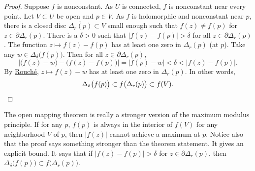 \documentclass[12pt,openany]{book}
\newcommand{\sabs}[1]{\lvert {#1} \rvert}
\newcommand{\abs}[1]{\left\lvert {#1} \right\rvert}
\theoremstyle{plain}
\theoremstyle{remark}
\theoremstyle{definition}
\theoremstyle{exercise}
\theoremstyle{example}
\begin{document}
\begin{proof}
Suppose $f$ is nonconstant.  As $U$ is connected, $f$ is nonconstant
near every point.
Let $V \subset U$ be open and $p \in V$.
As $f$
is holomorphic and nonconstant near $p$,  
there is a closed disc $\overline{\Delta_r(p)} \subset V$ small enough such that
$f(z) \not= f(p)$ for $z \in \partial \Delta_r(p)$.
There is a $\delta > 0$ such
that $\abs{f(z)-f(p)} > \delta$ for all $z \in \partial \Delta_r(p)$.
The function $z \mapsto f(z)-f(p)$ has at least one zero in $\Delta_r(p)$
(at $p$).  Take any $w \in \Delta_{\delta}\bigl(f(p)\bigr)$.  Then for
all $z \in \partial \Delta_r(p)$,
\begin{equation*}
\abs{\bigl( f(z)-w \bigr) - \bigl( f(z)-f(p) \bigr)} = \abs{f(p)-w} <
\delta < \abs{f(z)-f(p)} .
\end{equation*}
By \hyperref[thm:rouche2]{Rouch\'e}, $z \mapsto f(z)-w$ has at least one
zero in $\Delta_r(p)$.
In other words,
\begin{equation*}
\Delta_{\delta}\bigl(f(p)\bigr) \subset
f\bigl(\Delta_r(p)\bigr) \subset f(V) .  \qedhere
\end{equation*}
\end{proof}

The open mapping theorem is really a stronger version of
the maximum modulus principle.
If for any $p$,
$f(p)$ is always in the interior of $f(V)$ for any neighborhood $V$ of
$p$, then $\sabs{f(z)}$ cannot achieve a maximum at $p$.
Notice also that the proof says something stronger than the theorem statement.  It
gives an explicit bound.  It says that if 
$\abs{f(z)-f(p)} > \delta$ for $z \in \partial \Delta_r(p)$,
then
$\Delta_{\delta}\bigl(f(p)\bigr) \subset f\bigl(\Delta_r(p)\bigr)$.
\end{document}
